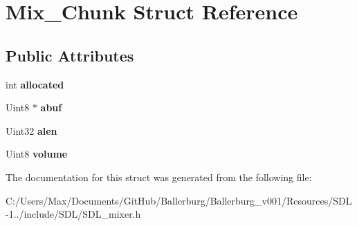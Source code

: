 \section{Mix\+\_\+\+Chunk Struct Reference}
\label{struct_mix___chunk}
\subsection*{Public Attributes}
\begin{DoxyCompactItemize}
\item 
int {\bfseries allocated}\label{struct_mix___chunk_a7b985b90b5f97fffe34834116a281615}

\item 
Uint8 $\ast$ {\bfseries abuf}\label{struct_mix___chunk_a30b3b1a72677d076a1caa72422bb3774}

\item 
Uint32 {\bfseries alen}\label{struct_mix___chunk_a958507964471fc4b9fa0d215f1852d05}

\item 
Uint8 {\bfseries volume}\label{struct_mix___chunk_afc566fd5da7f0ed1f3577f5bc0eac319}

\end{DoxyCompactItemize}


The documentation for this struct was generated from the following file\+:\begin{DoxyCompactItemize}
\item 
C\+:/\+Users/\+Max/\+Documents/\+Git\+Hub/\+Ballerburg/\+Ballerburg\+\_\+v001/\+Resources/\+S\+D\+L-\/1../include/\+S\+D\+L/S\+D\+L\+\_\+mixer.\+h\end{DoxyCompactItemize}
